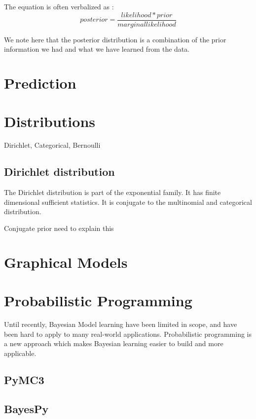 The equation is often verbalized as :
\begin{equation}
	posterior = \frac{likelihood * prior}{marginal likelihood}
\end{equation}

We note here that the posterior distribution is a combination of the prior information we had and what we have learned from the data. 




\section{Prediction}

\section{Distributions }

Dirichlet, Categorical, Bernoulli 
\subsection*{Dirichlet distribution}
The Dirichlet distribution is part of the exponential family. It has finite dimensional sufficient statistics. It is conjugate to the multinomial and categorical distribution. 

Conjugate prior  need to explain this 

\section{Graphical Models}

\section{Probabilistic Programming}

Until recently, Bayesian Model learning have been limited in scope, and have been hard to apply to many real-world applications. Probabilistic programming is a new approach which makes Bayesian learning easier to build and more applicable. 
\subsection{PyMC3}

\subsection{BayesPy}

